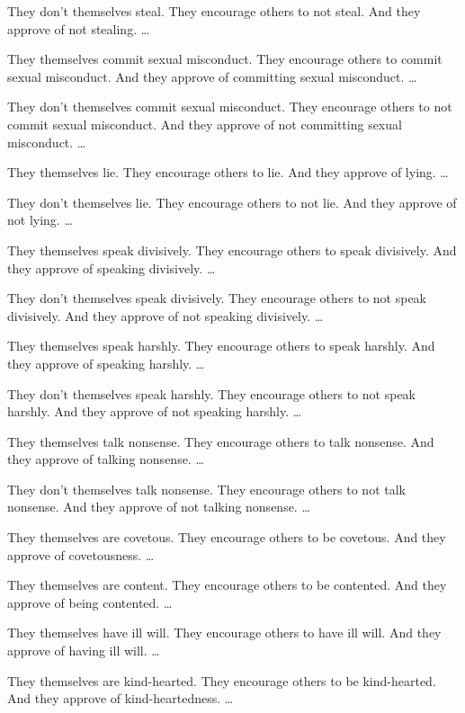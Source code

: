 \documentclass[12pt,openany]{book}%
\begin{document}
They don’t themselves steal. They encourage others to not steal. And they approve of not stealing. … 

They themselves commit sexual misconduct. They encourage others to commit sexual misconduct. And they approve of committing sexual misconduct. … 

They don’t themselves commit sexual misconduct. They encourage others to not commit sexual misconduct. And they approve of not committing sexual misconduct. … 

They themselves lie. They encourage others to lie. And they approve of lying. … 

They don’t themselves lie. They encourage others to not lie. And they approve of not lying. … 

They themselves speak divisively. They encourage others to speak divisively. And they approve of speaking divisively. … 

They don’t themselves speak divisively. They encourage others to not speak divisively. And they approve of not speaking divisively. … 

They themselves speak harshly. They encourage others to speak harshly. And they approve of speaking harshly. … 

They don’t themselves speak harshly. They encourage others to not speak harshly. And they approve of not speaking harshly. … 

They themselves talk nonsense. They encourage others to talk nonsense. And they approve of talking nonsense. … 

They don’t themselves talk nonsense. They encourage others to not talk nonsense. And they approve of not talking nonsense. … 

They themselves are covetous. They encourage others to be covetous. And they approve of covetousness. … 

They themselves are content. They encourage others to be contented. And they approve of being contented. … 

They themselves have ill will. They encourage others to have ill will. And they approve of having ill will. … 

They themselves are kind-hearted. They encourage others to be kind-hearted. And they approve of kind-heartedness. … 
\end{document}
